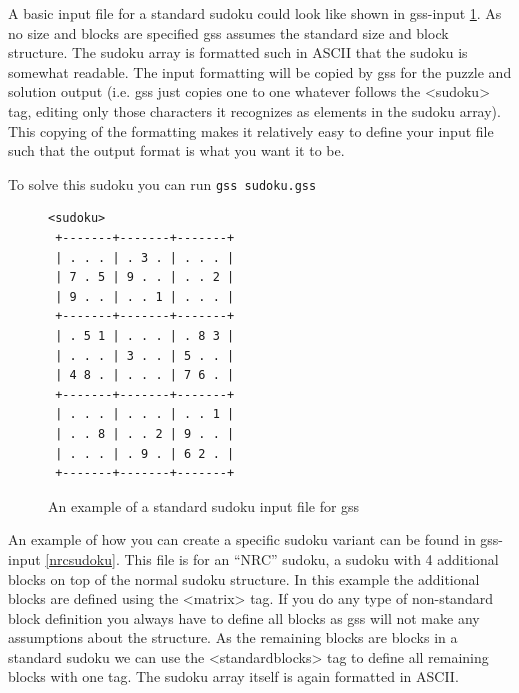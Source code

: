 \documentclass[12pt]{article}
\begin{document}
A basic input file for a standard sudoku could look like shown in gss-input \ref{plainsudoku}. As no size and blocks are specified gss assumes the standard size and block structure. The sudoku array is formatted such in ASCII that the sudoku is somewhat readable. The input formatting will be copied by gss for the puzzle and solution output (i.e. gss just copies one to one whatever follows the \textless sudoku\textgreater{} tag, editing only those characters it recognizes as elements in the sudoku array). This copying of the formatting makes it relatively easy to define your input file such that the output format is what you want it to be. 

To solve this sudoku you can run
\texttt{gss sudoku.gss}\\
\begin{figure}
\begin{verbatim}
<sudoku>
 +-------+-------+-------+ 
 | . . . | . 3 . | . . . |
 | 7 . 5 | 9 . . | . . 2 |
 | 9 . . | . . 1 | . . . |
 +-------+-------+-------+ 
 | . 5 1 | . . . | . 8 3 |
 | . . . | 3 . . | 5 . . |
 | 4 8 . | . . . | 7 6 . |
 +-------+-------+-------+ 
 | . . . | . . . | . . 1 |
 | . . 8 | . . 2 | 9 . . |
 | . . . | . 9 . | 6 2 . |
 +-------+-------+-------+
\end{verbatim}
\caption{\label{plainsudoku}An example of a standard sudoku input file for gss}
\end{figure}

An example of how you can create a specific sudoku variant can be found in gss-input \ref{nrcsudoku}. This file is for an ``NRC'' sudoku, a sudoku with 4 additional blocks on top of the normal sudoku structure. In this example the additional blocks are defined using the \textless matrix\textgreater{} tag. If you do any type of non-standard block definition you always have to define all blocks as gss will not make any assumptions about the structure. As the remaining blocks are blocks in a standard sudoku we can use the \textless standardblocks\textgreater{} tag to define all remaining blocks with one tag. The sudoku array itself is again formatted in ASCII. 
\end{document}
